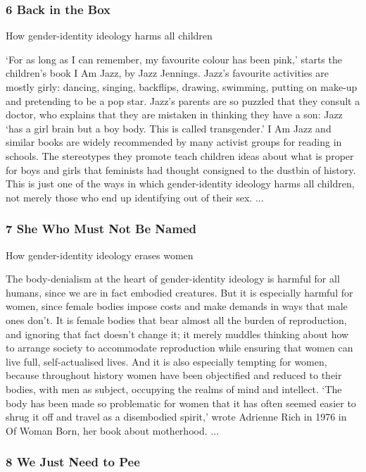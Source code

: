 \documentclass[10pt,titlepage]{book}
\begin{document}
\subsubsection{6 Back in the Box}

How gender-identity ideology harms all children

‘For as long as I can remember, my favourite colour has been pink,’ starts the children’s book I Am Jazz, by Jazz Jennings. Jazz’s favourite activities are mostly girly: dancing, singing, backflips, drawing, swimming, putting on make-up and pretending to be a pop star. Jazz’s parents are so puzzled that they consult a doctor, who explains that they are mistaken in thinking they have a son: Jazz ‘has a girl brain but a boy body. This is called transgender.’ I Am Jazz and similar books are widely recommended by many activist groups for reading in schools. The stereotypes they promote teach children ideas about what is proper for boys and girls that feminists had thought consigned to the dustbin of history. This is just one of the ways in which gender-identity ideology harms all children, not merely those who end up identifying out of their sex.
...

\subsubsection{7 She Who Must Not Be Named}

How gender-identity ideology erases women

The body-denialism at the heart of gender-identity ideology is harmful for all humans, since we are in fact embodied creatures. But it is especially harmful for women, since female bodies impose costs and make demands in ways that male ones don’t. It is female bodies that bear almost all the burden of reproduction, and ignoring that fact doesn’t change it; it merely muddles thinking about how to arrange society to accommodate reproduction while ensuring that women can live full, self-actualised lives. And it is also especially tempting for women, because throughout history women have been objectified and reduced to their bodies, with men as subject, occupying the realms of mind and intellect. ‘The body has been made so problematic for women that it has often seemed easier to shrug it off and travel as a disembodied spirit,’ wrote Adrienne Rich in 1976 in Of Woman Born, her book about motherhood.
...

\subsubsection{8 We Just Need to Pee}
\end{document}
